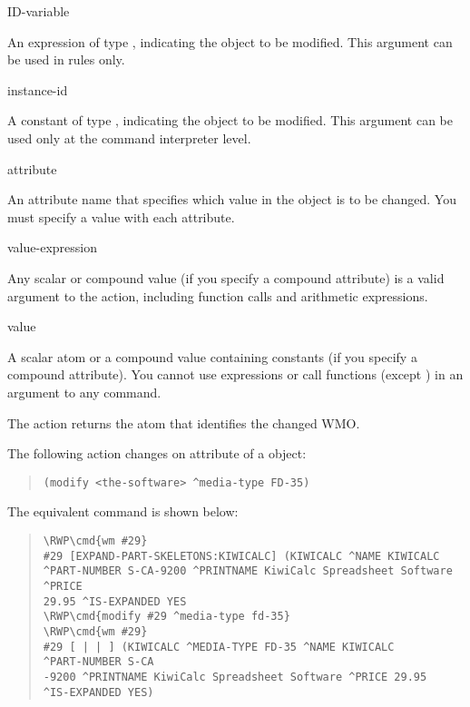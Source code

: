 \begin{arguments}
\item[ID-variable]

  An expression of type , indicating the object to be
  modified. This argument can be used in rules only.

\item[instance-id]

  A constant of type , indicating the object to be
  modified. This argument can be used only at the command interpreter
  level.

\item[attribute]

  An attribute name that specifies which value in the object is to be
  changed. You must specify a value with each attribute.

\item[value-expression]

  Any scalar or compound value (if you specify a compound attribute)
  is a valid argument to the  action, including function
  calls and arithmetic expressions.

\item[value]

  A scalar atom or a compound value containing constants (if you
  specify a compound attribute). You cannot use expressions or call
  functions (except ) in an argument to any command.
\end{arguments}

\ReturnValue

The  action returns the  atom that
identifies the changed WMO.

\Example

The following action changes on attribute of a 
object:

\begin{quote}
\begin{verbatim}
(modify <the-software> ^media-type FD-35)
\end{verbatim}
\end{quote}

The equivalent command is shown below:

\begin{quote}
\begin{Verbatim}[commandchars=\\\{\}]
\RWP\cmd{wm #29}
#29 [EXPAND-PART-SKELETONS:KIWICALC] (KIWICALC ^NAME KIWICALC
^PART-NUMBER S-CA-9200 ^PRINTNAME KiwiCalc Spreadsheet Software ^PRICE
29.95 ^IS-EXPANDED YES
\RWP\cmd{modify #29 ^media-type fd-35}
\RWP\cmd{wm #29}
#29 [ | | ] (KIWICALC ^MEDIA-TYPE FD-35 ^NAME KIWICALC
^PART-NUMBER S-CA
-9200 ^PRINTNAME KiwiCalc Spreadsheet Software ^PRICE 29.95
^IS-EXPANDED YES)
\end{Verbatim}
\end{quote}

